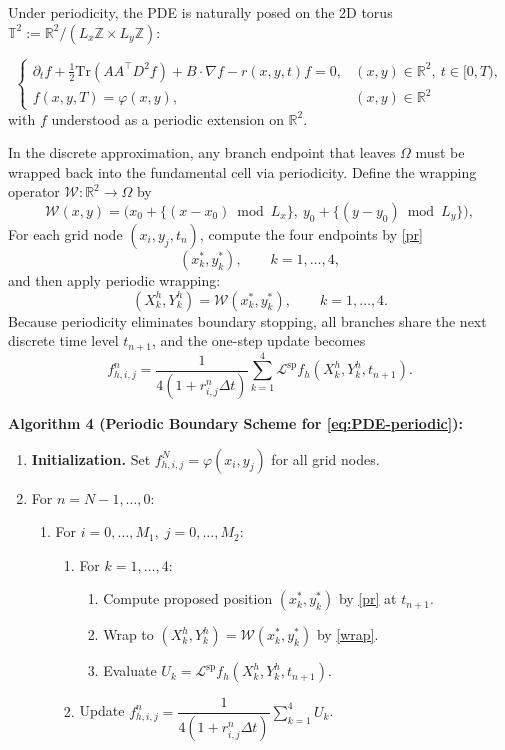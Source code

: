\documentclass[11pt]{article}
\theoremstyle{mythm}
\theoremstyle{definition}
\begin{document}
	Under periodicity, the PDE is naturally posed on the 2D torus 
	$\mathbb{T}^2 := \mathbb{R}^2 / (L_x\mathbb{Z} \times L_y\mathbb{Z})$:
	
	\begin{equation}  \label{eq:PDE-periodic}
		\begin{cases}  
			\partial_t f + \frac{1}{2}\mathrm{Tr}(AA^\top D^2 f) + B\cdot\nabla f - r(x,y,t)f = 0, 
			& (x,y)\in\mathbb{R}^2,\ t\in[0,T), \\
			f(x,y,T) = \varphi(x,y), & (x,y)\in\mathbb{R}^2
		\end{cases}
	\end{equation}
	with $f$ understood as a periodic extension on $\mathbb{R}^2$.
	
	In the discrete approximation, any branch endpoint that leaves $\Omega$ must be wrapped 
	back into the fundamental cell via periodicity.  
	Define the wrapping operator $\mathcal{W}: \mathbb{R}^2\to\Omega$ by
	\begin{equation}
		\label{wrap}
		\mathcal{W}(x,y)
		=
		\bigl(x_0 + \{(x-x_0)\bmod L_x\},\ 
		y_0 + \{(y-y_0)\bmod L_y\}\bigr),
	\end{equation}
	For each grid node $(x_i,y_j,t_n)$, compute the four  endpoints by \eqref{pr}
	\[
	(x_k^*, y_k^*), \qquad k=1,\dots,4,
	\]
	and then apply periodic wrapping:
	\[
	(X_k^h,Y_k^h) = \mathcal{W}(x_k^*, y_k^*), \qquad k=1,\dots,4.
	\]
	Because periodicity eliminates boundary stopping, all branches share the next discrete time level 
	$t_{n+1}$, and the one-step update becomes
	\begin{equation}
		\label{eq:periodic-update}
		f_{h,i,j}^n
		=
		\frac{1}{4(1+r_{i,j}^n\Delta t)}
		\sum_{k=1}^4 
		\mathcal{L}^{\mathrm{sp}} f_h(X_k^h,Y_k^h, t_{n+1}).
	\end{equation}
	
	\noindent
	\textbf{Algorithm 4 (Periodic Boundary Scheme for \eqref{eq:PDE-periodic}):}
	\begin{enumerate}
		\item \textbf{Initialization.} Set \(f_{h,i,j}^N = \varphi(x_i, y_j)\) for all grid nodes.
		\item For \(n = N-1, \ldots, 0\):
		\begin{enumerate}
			\item For \(i = 0, \ldots, M_1,\; j = 0, \ldots, M_2\): 
			\begin{enumerate}
				\item For \(k = 1, \ldots, 4\):
				\begin{enumerate}
					\item Compute proposed position \((x_k^*, y_k^*)\) by \eqref{pr} at \(t_{n+1}\).
					\item Wrap to \((X_k^h,Y_k^h) = \mathcal{W}(x_k^*, y_k^*)\) by \eqref{wrap}.
					\item Evaluate \(U_k = \mathcal{L}^{\mathrm{sp}} f_h(X_k^h,Y_k^h, t_{n+1})\).
				\end{enumerate}
				\item Update \(f_{h,i,j}^n = \dfrac{1}{4(1 + r_{i,j}^n \Delta t)} \sum_{k=1}^4 U_k\).
			\end{enumerate}
		\end{enumerate}
	\end{enumerate}
	
\end{document}
